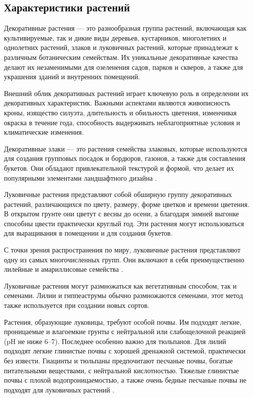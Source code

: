 \subsection{Характеристики растений}
Декоративные растения — это разнообразная группа растений, включающая как культивируемые, так и дикие виды деревьев, кустарников, многолетних и однолетних растений, злаков и луковичных растений, которые принадлежат к различным ботаническим семействам. Их уникальные декоративные качества делают их незаменимыми для озеленения садов, парков и скверов, а также для украшения зданий и внутренних помещений.

Внешний облик декоративных растений играет ключевую роль в определении их декоративных характеристик. Важными аспектами являются живописность кроны, изящество силуэта, длительность и обильность цветения, изменчивая окраска в течение года, способность выдерживать неблагоприятные условия и климатические изменения.

Декоративные злаки — это растения семейства злаковых, которые используются для создания групповых посадок и бордюров, газонов, а также для составления букетов. Они обладают привлекательной текстурой и формой, что делает их популярными элементами ландшафтного дизайна \cite{kingsberry}.

Луковичные растения представляют собой обширную группу декоративных растений, различающихся по цвету, размеру, форме цветков и времени цветения. В открытом грунте они цветут с весны до осени, а благодаря зимней выгонке способны цвести практически круглый год. Эти растения могут использоваться для выращивания в помещении и для создания букетов.

С точки зрения распространения по миру, луковичные растения представляют одну из самых многочисленных групп. Они включают в себя преимущественно лилейные и амариллисовые семейства \cite{belyaevskaya}.

Луковичные растения могут размножаться как вегетативным способом, так и семенами. Лилии и гиппеаструмы обычно размножаются семенами, этот метод также используется при создании новых сортов.

Растения, образующие луковицы, требуют особой почвы. Им подходят легкие, проницаемые и влагоемкие грунты с нейтральной или слабощелочной реакцией (pH не ниже 6–7). Последнее особенно важно для тюльпанов. Для лилий подходят легкие глинистые почвы с хорошей дренажной системой, практически без извести. Гиацинты и тюльпаны предпочитают песчаные почвы, богатые питательными веществами, с нейтральной кислотностью. Тяжелые глинистые почвы с плохой водопроницаемостью, а также очень бедные песчаные почвы не подходят для луковичных растений \cite{doroshenko}.

